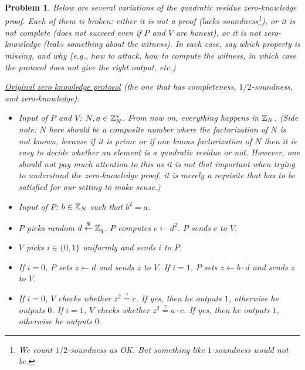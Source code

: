 \documentclass{../homework}
\newtheorem{problem}{Problem}
\newcommand{\rgets}{\stackrel{\mathdollar}\leftarrow}
\newcommand{\iseq}{\stackrel{?}=}
\begin{document}
\begin{problem}
    Below are several variations of the quadratic residue zero-knowledge proof.
    Each of them is broken: either it is not a proof (lacks
    soundness\footnote{We count $1/2$-soundness as OK. But something like
    $1$-soundness would not be.}), or it is not complete (does not succeed even
    if $P$ and $V$ are honest), or it is not zero-knowledge (leaks something
    about the witness). In each case, say which property is missing, and why
    (e.g., how to attack, how to compute the witness, in which case the
    protocol does not give the right output, etc.)
    
    \underline{Original zero knowledge protocol} (the one that has
    completeness, $1/2$-soundness, and zero-knowledge):
    \begin{itemize}
        \item Input of $P$ and $V$: $N,a\in \mathbb Z_N^{*}$. From now on, everything
        happens in $\mathbb Z_N$. (Side note: $N$ here should be a composite number
        where the factorization of $N$ is not known, because if it is prime or
        if one knows factorization of $N$ then it is easy to decide whether an
        element is a quadratic residue or not. However, one should not pay much
        attention to this as it is not that important when trying to understand
        the zero-knowledge proof, it is merely a requisite that has to be
        satisfied for our setting to make sense.)
        \item Input of $P$: $b\in \mathbb Z_N$ such that $b^2=a$.
        \item $P$ picks random $d\rgets \Z_q$. $P$ computes $c\gets d^2$. $P$
        sends $c$ to $V$.
        \item $V$ picks $i\in\{0,1\}$ uniformly and sends $i$ to $P$.
        \item If $i=0$, $P$ sets $z\gets d$ and sends $z$ to $V$. If $i=1$, $P$
        sets $z\gets b\cdot d$ and sends $z$ to $V$.
        \item  If $i=0$, $V$ checks whether $z^2\iseq c$. If yes, then he
        outputs $1$, otherwise he outputs $0$.  If $i=1$, $V$ checks whether
        $z^2\iseq a\cdot c$. If yes, then he outputs $1$, otherwise he outputs
        $0$.
    \end{itemize}
    

\end{problem}
\end{document}
